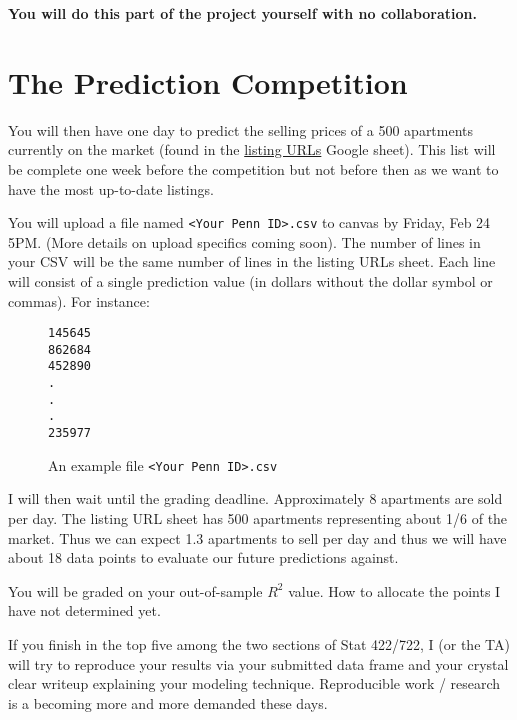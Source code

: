\documentclass[12pt]{article}
\begin{document}
\textbf{You will do this part of the project yourself with no collaboration.}

\section{The Prediction Competition}

You will then have one day to predict the selling prices of a 500 apartments currently on the market (found in the \href{https://docs.google.com/spreadsheets/d/12cOzcQlz9WCayasqB-sx_9E6gjQH0-eCuryqJUucZ50/edit#gid=0}{listing URLs} Google sheet). This list will be complete one week before the competition but not before then as we want to have the most up-to-date listings.

You will upload a file named \texttt{<Your Penn ID>.csv} to canvas by Friday, Feb 24 5PM. (More details on upload specifics coming soon). The number of lines in your CSV will be the same number of lines in the listing URLs sheet. Each line will consist of a single prediction value (in dollars without the dollar symbol or commas). For instance:

\begin{figure}[htp]
\begin{Verbatim}[frame=single, fontsize = \small]
145645
862684
452890
.
.
.
235977
\end{Verbatim}
\caption{An example file \texttt{<Your Penn ID>.csv}}
\end{figure}

I will then wait until the grading deadline. Approximately 8 apartments are sold per day. The listing URL sheet has 500 apartments representing about 1/6 of the market. Thus we can expect 1.3 apartments to sell per day and thus we will have about 18 data points to evaluate our future predictions against.

You will be graded on your out-of-sample $R^2$ value. How to allocate the points I have not determined yet.

If you finish in the top five among the two sections of Stat 422/722, I (or the TA) will try to reproduce your results via your submitted data frame and your crystal clear writeup explaining your modeling technique. Reproducible work / research is a becoming more and more demanded these days.
\end{document}
